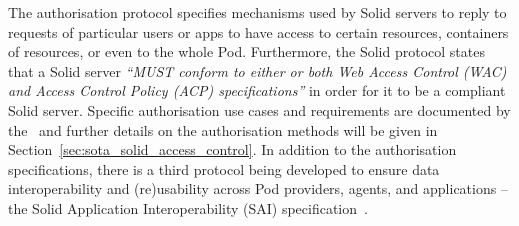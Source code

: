 The authorisation protocol specifies mechanisms used by Solid servers to reply to requests of particular users or apps to have access to certain resources, containers of resources, or even to the whole Pod.
Furthermore, the Solid protocol states that a Solid server \textit{``MUST conform to either or both Web Access Control (WAC) and Access Control Policy (ACP) specifications''} in order for it to be a compliant Solid server.
Specific authorisation use cases and requirements are documented by the~\cite{solid_editorial_team_use_2023} and further details on the authorisation methods will be given in Section~\ref{sec:sota_solid_access_control}.
In addition to the authorisation specifications, there is a third protocol being developed to ensure data interoperability and (re)usability across Pod providers, agents, and applications -- the Solid Application Interoperability (SAI) specification~\citep{bingham_interop_2023}.

